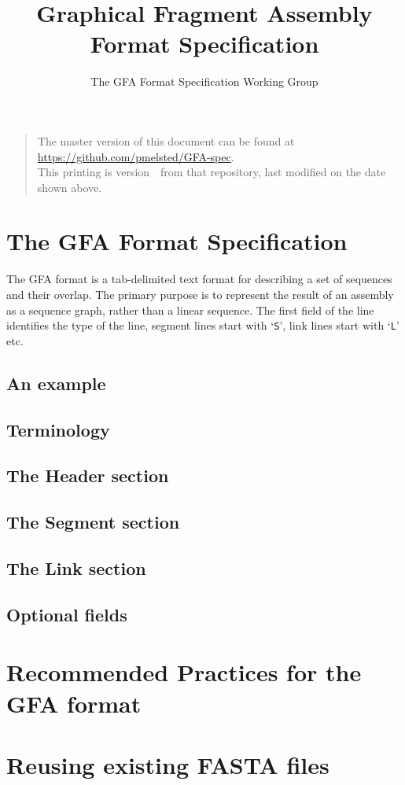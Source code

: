 \documentclass[10pt]{article}
\begin{document}

\title{Graphical Fragment Assembly Format Specification}
\author{The GFA Format Specification Working Group}
\date{\headdate}
\maketitle
\begin{quote}\small
The master version of this document can be found at
\url{https://github.com/pmelsted/GFA-spec}.\\
This printing is version~\commitdesc\ from that repository,
last modified on the date shown above.
\end{quote}
\vspace*{1em}


\section{The GFA Format Specification}
The GFA format is a tab-delimited text format for describing a set of sequences
and their overlap. The primary purpose is to represent the result of an assembly
as a sequence graph, rather than a linear sequence. The first field of the line
identifies the type of the line, segment lines start with `{\tt S}', link lines
start with `{\tt L}' etc.

\subsection{An example}

\subsection{Terminology}

\subsection{The Header section}

\subsection{The Segment section}

\subsection{The Link section}

\subsection{Optional fields}

\section{Recommended Practices for the GFA format}

\section{Reusing existing FASTA files}
\end{document}
